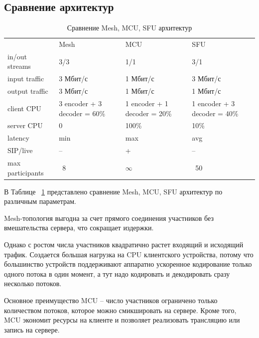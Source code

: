 \subsection{Сравнение архитектур}

\begin{center}
    \begin{longtable}{|p{4cm}|p{3cm}|p{3cm}|p{3cm}|}
     \captionsetup{singlelinecheck=off}
    \caption{
    \label{architecture-comparison}
        Сравнение Mesh, MCU, SFU архитектур}\\
    \hline
     & Mesh & MCU & SFU\\ 
    \hline 
    in/out streams & 3/3 & 1/1 & 3/1\\
    \hline
    input traffic & 3 Мбит/с & 1 Мбит/с & 3 Мбит/с\\
    \hline
    output traffic & 3 Мбит/с & 1 Мбит/с & 1 Мбит/с\\
    \hline
    client CPU & 3 encoder + 3 decoder = 60\% & 1 encoder + 1 decoder = 20\% & 1 encoder + 3 decoder = 40\%\\
    \hline
    server CPU & 0 & 100\% & 10\%\\
    \hline
    latency & min & max & avg\\
    \hline
    SIP/live & -- & + & --\\
    \hline
    max participants & ~8 & $\infty$ & ~50\\
    \hline
    \end{longtable}
\end{center}

В Таблице ~\ref{architecture-comparison} представлено сравнение Mesh, MCU, SFU архитектур по различным параметрам.


Mesh-топология выгодна за счет прямого соединения участников без вмешательства сервера, что сокращает издержки. 

Однако с ростом числа участников квадратично растет входящий и исходящий трафик. Создается большая нагрузка на CPU клиентского устройства, потому что большинство устройств поддерживают аппаратно ускоренное кодирование только одного потока в один момент, а тут надо кодировать и декодировать сразу несколько потоков.


Основное преимущество MCU -- число участников ограничено только количеством потоков, которое можно смикшировать на сервере. Кроме того, MCU экономит ресурсы на клиенте и позволяет реализовать трансляцию или запись на сервере.

